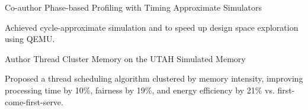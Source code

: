 

\begin{cventries}

  \cventry
    {Co-author} %
    {Phase-based Profiling with Timing Approximate Simulators} %
    {} %
    {} %
    {
      \begin{cvitems} %
        \item {Achieved cycle-approximate simulation and to speed up design space
          exploration using QEMU.}
      \end{cvitems}
    }

  \cventry
    {Author} %
    {Thread Cluster Memory on the UTAH Simulated Memory} %
    {} %
    {} %
    {
      \begin{cvitems} %
        \item {Proposed a thread scheduling algorithm clustered by memory
            intensity, improving processing time by 10\%, fairness by 19\%,
            and energy efficiency by 21\% vs. first-come-first-serve.}
      \end{cvitems}
    }

\end{cventries}
